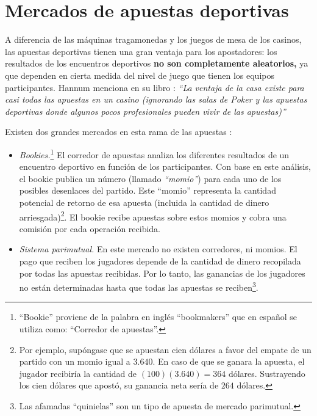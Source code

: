  \section{Mercados de apuestas deportivas}
 \label{sec:apuestasd-deportivas}
 
 A diferencia de las máquinas tragamonedas y los juegos de mesa de los casinos, las apuestas deportivas tienen una gran ventaja para los apostadores: los resultados de los encuentros deportivos \textbf{no son completamente aleatorios,} ya que dependen en cierta medida del nivel de juego que tienen los equipos participantes. Hannum menciona en su libro \cite{hannum2005practical} : \emph{``La ventaja de la casa existe para casi todas las apuestas en un casino (ignorando las salas de Poker y las apuestas deportivas donde algunos pocos profesionales pueden vivir de las apuestas)''}

 Existen dos grandes mercados en esta rama de las apuestas \cite{chung2010empirical}:
 \begin{itemize} 
 	\item \emph{Bookies.}\footnote{``Bookie'' proviene de la palabra en inglés ``bookmakers'' que en español se utiliza como: ``Corredor de apuestas''.} El corredor de apuestas analiza los diferentes resultados de un encuentro deportivo en función de los participantes. Con base en este análisis, el bookie publica un número (llamado \emph{``momio''}) para cada uno de los posibles desenlaces del partido. Este ``momio'' representa la cantidad potencial de retorno de esa apuesta (incluida la cantidad de dinero arriesgada)\footnote{Por ejemplo, supóngase que se apuestan cien dólares a favor del empate de un partido con un momio igual a $3.640$. En caso de que se ganara la apuesta, el jugador recibiría la cantidad de $(100)(3.640) = 364$ dólares. Sustrayendo los cien dólares que apostó, su ganancia neta sería de $264$ dólares.}. El bookie recibe apuestas sobre estos momios y cobra una comisión por cada operación recibida. 
 	\item \emph{Sistema parimutual.} En este mercado no existen  corredores, ni momios. El pago que reciben los jugadores depende de la cantidad de dinero recopilada por todas las apuestas recibidas. Por lo tanto, las ganancias de los jugadores no están determinadas hasta que todas las apuestas se reciben\footnote{Las afamadas ``quinielas'' son un tipo de apuesta de mercado parimutual.}.
 	\end{itemize}

